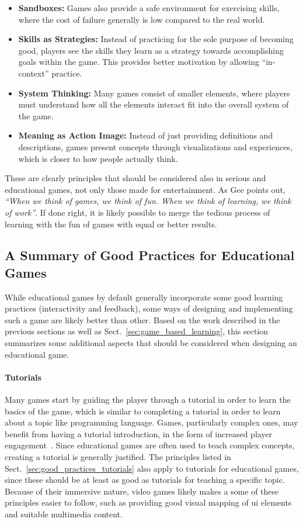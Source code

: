 \begin{itemize}
	\item{\textbf{Sandboxes:}} Games also provide a safe environment for exercising skills, where the cost of failure generally is low compared to the real world.
	\item{\textbf{Skills as Strategies:}} Instead of practicing for the sole purpose of becoming good, players see the skills they learn as a strategy towards accomplishing goals within the game. This provides better motivation by allowing ``in-context'' practice.
	\item{\textbf{System Thinking:}} Many games consist of smaller elements, where players must understand how all the elements interact fit into the overall system of the game.
	\item{\textbf{Meaning as Action Image:}} Instead of just providing definitions and descriptions, games present concepts through visualizations and experiences, which is closer to how people actually think.
\end{itemize}

\noindent
These are clearly principles that should be considered also in serious and educational games, not only those made for entertainment. As Gee points out, \emph{``When we think of games, we think of fun. When we think of learning, we think of work''}. If done right, it is likely possible to merge the tedious process of learning with the fun of games with equal or better results.

\subsection{A Summary of Good Practices for Educational Games}
\label{sec:good_practices_games}
While educational games by default generally incorporate some good learning practices (interactivity and feedback), some ways of designing and implementing such a game are likely better than other. Based on the work described in the previous sections as well as Sect.~\ref{sec:game_based_learning}, this section summarizes some additional aspects that should be considered when designing an educational game.

\paragraph{Tutorials} Many games start by guiding the player through a tutorial in order to learn the basics of the game, which is similar to completing a tutorial in order to learn about a topic like programming language. Games, particularly complex ones, may benefit from having a tutorial introduction, in the form of increased player engagement~\cite{andersen:tutorials_impact}. Since educational games are often used to teach complex concepts, creating a tutorial is generally justified. The principles listed in Sect.~\ref{sec:good_practices_tutorials} also apply to tutorials for educational games, since these should be at least as good as tutorials for teaching a specific topic. Because of their immersive nature, video games likely makes a some of these principles easier to follow, such as providing good visual mapping of \gls{ui} elements and suitable multimedia content.

